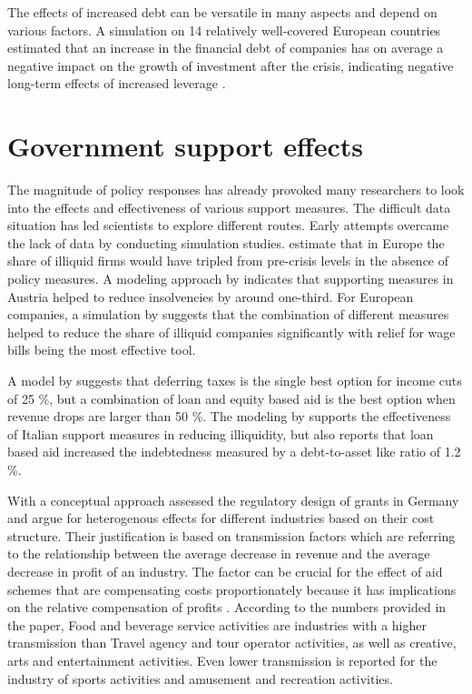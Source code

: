 The effects of increased debt can be versatile in many aspects and depend on various factors. A simulation on 14 relatively well-covered European countries estimated that an increase in the financial debt of companies has on average a negative impact on the growth of investment after the crisis, indicating negative long-term effects of increased leverage \parencite{demmou_insolvency_2021}.




\section{Government support effects}

The magnitude of policy responses has already provoked many researchers to look into the effects and effectiveness of various support measures. The difficult data situation has led scientists to explore different routes. 
Early attempts overcame the lack of data by conducting simulation studies. \parencite{ebeke_corporate_2021} estimate that in Europe the share of illiquid firms would have tripled from pre-crisis levels in the absence of policy measures.
A modeling approach by \parencite{puhr_have_2021} indicates that supporting measures in Austria helped to reduce insolvencies by around one-third. 
For European companies, a simulation by \parencite{demmou_liquidity_2021} suggests that the combination of different measures helped to reduce the share of illiquid companies significantly with relief for wage bills being the most effective tool.

A model by \parencite{chang_studying_2022} suggests that deferring taxes is the single best option for income cuts of 25 \%, but a combination of loan and equity based aid is the best option when revenue drops are larger than 50 \%.
The modeling by \parencite{parlapiano_effects_2020} supports the effectiveness of Italian support measures in reducing illiquidity, but also reports that loan based aid increased the indebtedness measured by a debt-to-asset like ratio of 1.2 \%.

With a conceptual approach \parencite{bischof_bedeutung_2021} assessed the regulatory design of grants in Germany and argue for heterogenous effects for different industries based on their cost structure. Their justification is based on transmission factors which are referring to the relationship between the average decrease in revenue and the average decrease in profit of an industry. The factor can be crucial for the effect of aid schemes that are compensating costs proportionately because it has implications on the relative compensation of profits \parencite{bischof_bedeutung_2021}. According to the numbers provided in the paper, Food and beverage service activities are industries with a higher transmission than Travel agency and tour operator activities, as well as creative, arts and entertainment activities. Even lower transmission is reported for the industry of sports activities and amusement and recreation activities.



